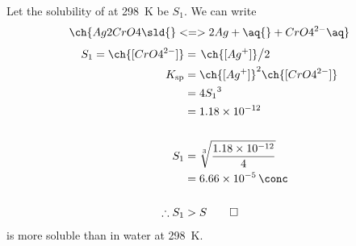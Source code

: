 Let the solubility of  at \qty{298}{\kelvin} be \(S_1\). We can write
\begin{equation}
	\ch{Ag2CrO4 \sld{} <=> 2 Ag+ \aq{} + CrO4^{2-} \aq}
	\label{eq:ag2cro4}
\end{equation}
\begin{align*}
	S_1 = \ch{[CrO4^{2-}]} & = \slf{\ch{[Ag^{+}]}}{2}           \\
	K_{\text{sp}}          & = \ch{[Ag^{+}]}^2 \ch{[CrO4^{2-}]} \\
	                       & = 4{S_1}^3                         \\
	                       & = \num{1.18e-12}                   \\
	\\
	S_1                    & = \sqrt[3]{\f{\num{1.18e-12}}{4}}  \\
	                       & = \qty{6.66e-5}{\conc}             \\
	\\
	\therefore S_1         & > S \qed
\end{align*}
{\color{accent}  is more soluble than  in water at \qty{298}{\kelvin}.}
